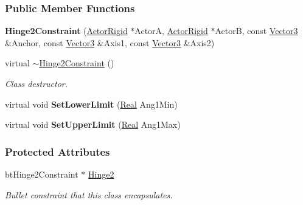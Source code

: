 \subsubsection*{Public Member Functions}
\begin{DoxyCompactItemize}
\item 
\hypertarget{classMezzanine_1_1Hinge2Constraint_acc0b4c6d39072f6e774e41c43381b6d8}{
{\bfseries Hinge2Constraint} (\hyperlink{classMezzanine_1_1ActorRigid}{ActorRigid} $\ast$ActorA, \hyperlink{classMezzanine_1_1ActorRigid}{ActorRigid} $\ast$ActorB, const \hyperlink{classMezzanine_1_1Vector3}{Vector3} \&Anchor, const \hyperlink{classMezzanine_1_1Vector3}{Vector3} \&Axis1, const \hyperlink{classMezzanine_1_1Vector3}{Vector3} \&Axis2)}
\label{classMezzanine_1_1Hinge2Constraint_acc0b4c6d39072f6e774e41c43381b6d8}

\item 
virtual \hyperlink{classMezzanine_1_1Hinge2Constraint_ac4cc8c1d461358a508785d0ccd9ea1e7}{$\sim$Hinge2Constraint} ()
\begin{DoxyCompactList}\small\item\em Class destructor. \item\end{DoxyCompactList}\item 
\hypertarget{classMezzanine_1_1Hinge2Constraint_acd405150e1822ae0954bf561ab52b7e7}{
virtual void {\bfseries SetLowerLimit} (\hyperlink{namespaceMezzanine_a726731b1a7df72bf3583e4a97282c6f6}{Real} Ang1Min)}
\label{classMezzanine_1_1Hinge2Constraint_acd405150e1822ae0954bf561ab52b7e7}

\item 
\hypertarget{classMezzanine_1_1Hinge2Constraint_a83ebdb0a49039249345ab0bef026cabd}{
virtual void {\bfseries SetUpperLimit} (\hyperlink{namespaceMezzanine_a726731b1a7df72bf3583e4a97282c6f6}{Real} Ang1Max)}
\label{classMezzanine_1_1Hinge2Constraint_a83ebdb0a49039249345ab0bef026cabd}

\end{DoxyCompactItemize}
\subsubsection*{Protected Attributes}
\begin{DoxyCompactItemize}
\item 
\hypertarget{classMezzanine_1_1Hinge2Constraint_aa28404d12e0d294b277004cdb851465a}{
btHinge2Constraint $\ast$ \hyperlink{classMezzanine_1_1Hinge2Constraint_aa28404d12e0d294b277004cdb851465a}{Hinge2}}
\label{classMezzanine_1_1Hinge2Constraint_aa28404d12e0d294b277004cdb851465a}

\begin{DoxyCompactList}\small\item\em Bullet constraint that this class encapsulates. \item\end{DoxyCompactList}\end{DoxyCompactItemize}


